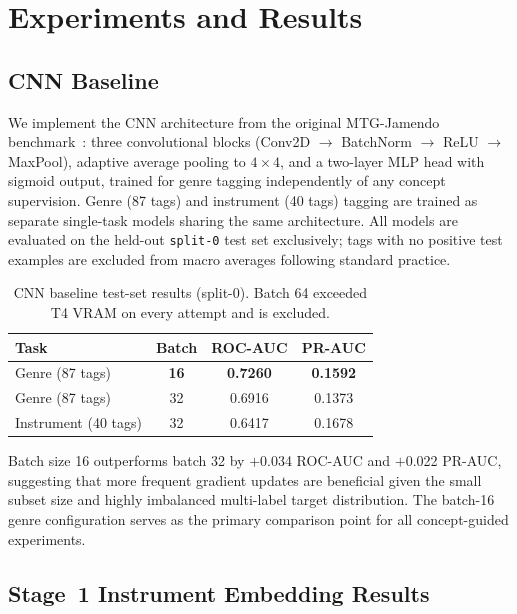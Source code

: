 \documentclass[sigconf,nonacm]{acmart}
\begin{document}
\section{Experiments and Results}

\subsection{CNN Baseline}

We implement the CNN architecture from the original MTG-Jamendo benchmark~\cite{hershey2017cnn}:
three convolutional blocks (Conv2D $\to$ BatchNorm $\to$ ReLU $\to$ MaxPool), adaptive average
pooling to $4\!\times\!4$, and a two-layer MLP head with sigmoid output, trained for genre
tagging independently of any concept supervision. Genre (87 tags) and instrument (40 tags)
tagging are trained as separate single-task models sharing the same architecture. All models
are evaluated on the held-out \texttt{split-0} test set exclusively; tags with no positive test
examples are excluded from macro averages following standard practice.

\begin{table}[h]
  \caption{CNN baseline test-set results (split-0). Batch 64 exceeded T4 VRAM on every
           attempt and is excluded.}
  \label{tab:baseline}
  \begin{tabular}{lccc}
    \toprule
    Task & Batch & ROC-AUC & PR-AUC \\
    \midrule
    Genre (87 tags)      & \textbf{16} & \textbf{0.7260} & \textbf{0.1592} \\
    Genre (87 tags)      & 32          & 0.6916          & 0.1373          \\
    Instrument (40 tags) & 32          & 0.6417          & 0.1678          \\
    \bottomrule
  \end{tabular}
\end{table}

Batch size 16 outperforms batch 32 by $+$0.034 ROC-AUC and $+$0.022 PR-AUC, suggesting that
more frequent gradient updates are beneficial given the small subset size and highly imbalanced
multi-label target distribution. The batch-16 genre configuration serves as the primary
comparison point for all concept-guided experiments.

\subsection{Stage~1 Instrument Embedding Results}
\end{document}
